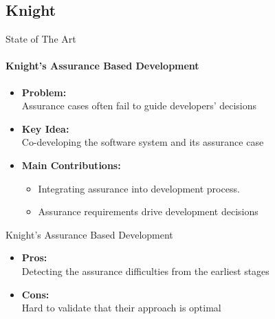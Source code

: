 \documentclass[xcolor=x11names,compress]{beamer}
\renewcommand{\(}{\begin{columns}}
\renewcommand{\)}{\end{columns}}
\newcommand{\<}[1]{\begin{column}{#1}}
\renewcommand{\>}{\end{column}}
\begin{document}

\subsection{Knight}
\begin{frame}{State of The Art}
\framesubtitle{Knight's Assurance Based Development \cite{Knight:Assurance}}
\begin{itemize}
\item \textbf{Problem:}\\Assurance cases often fail to guide developers' decisions
\item \textbf{Key Idea:} \\Co-developing the software system and its assurance case
\item \textbf{Main Contributions:}
\begin{itemize}
	\item Integrating assurance into development process.
    \item Assurance requirements drive development decisions
\end{itemize}
\end{itemize}

\end{frame}

\begin{frame}{Knight's Assurance Based Development}
\begin{itemize}
\item \textbf{Pros:} \\
	Detecting the assurance difficulties from the earliest stages
\item \textbf{Cons:} \\
	Hard to validate that their approach is optimal
\end{itemize}
\end{frame}

\end{document}
